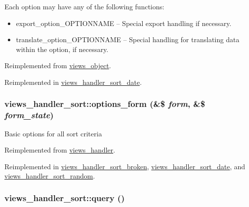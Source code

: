  Each option may have any of the following functions:\begin{itemize}
\item export\_\-option\_\-OPTIONNAME -- Special export handling if necessary.\item translate\_\-option\_\-OPTIONNAME -- Special handling for translating data within the option, if necessary. \end{itemize}


Reimplemented from \hyperlink{classviews__object_b0753d0001c8c9ff98beee696b4516ba}{views\_\-object}.

Reimplemented in \hyperlink{classviews__handler__sort__date_e46b66b6623fc747b821664b60c98b10}{views\_\-handler\_\-sort\_\-date}.\hypertarget{classviews__handler__sort_ba953218e09ab9da8f6ed0a67f046455}{
\subsubsection[{options\_\-form}]{\setlength{\rightskip}{0pt plus 5cm}views\_\-handler\_\-sort::options\_\-form (\&\$ {\em form}, \/  \&\$ {\em form\_\-state})}}
\label{classviews__handler__sort_ba953218e09ab9da8f6ed0a67f046455}


Basic options for all sort criteria 

Reimplemented from \hyperlink{classviews__handler_a41fcf16b177eb03e35facbae6320f74}{views\_\-handler}.

Reimplemented in \hyperlink{classviews__handler__sort__broken_57d7f6176962083d4c17cbf448cb792f}{views\_\-handler\_\-sort\_\-broken}, \hyperlink{classviews__handler__sort__date_622c39d35c93e620cc6fa6ae2ab37ab4}{views\_\-handler\_\-sort\_\-date}, and \hyperlink{classviews__handler__sort__random_51a854154f820622661702ec10532cdb}{views\_\-handler\_\-sort\_\-random}.\hypertarget{classviews__handler__sort_94fa33c5d037e41a927583fce2df3d18}{
\subsubsection[{query}]{\setlength{\rightskip}{0pt plus 5cm}views\_\-handler\_\-sort::query ()}}
\label{classviews__handler__sort_94fa33c5d037e41a927583fce2df3d18}


